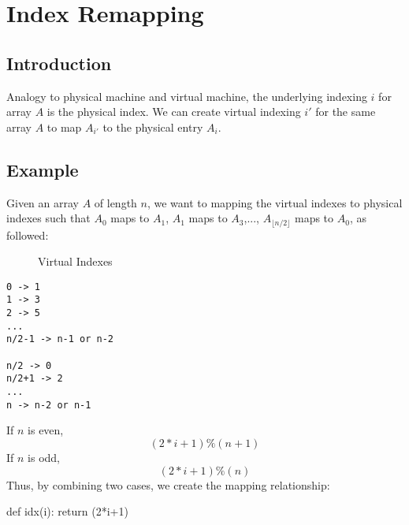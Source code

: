 \section{Index Remapping}
\subsection{Introduction}
 Analogy to physical machine and virtual machine, the underlying indexing $i$ for array $A$ is the physical index. We can create virtual indexing $i'$ for the same array $A$ to map $A_{i'}$ to the physical entry $A_{i}$.
\subsection{Example}
 Given an array $A$ of length $n$, we want to mapping the virtual indexes to physical indexes such that $A_0$ maps to $A_1$, $A_1$ maps to $A_3$,..., $A_{\lfloor n/2\rfloor}$ maps to $A_0$, as followed: 
\begin{figure}[hbtp]
\centering
{}
\caption{Virtual Indexes}
\label{fig:virtual_indexes}
\end{figure}
\begin{lstlisting}
0 -> 1
1 -> 3
2 -> 5
...
n/2-1 -> n-1 or n-2

n/2 -> 0
n/2+1 -> 2
...
n -> n-2 or n-1
\end{lstlisting}
If $n$ is even, 
$$
(2*i+1)\%(n+1)
$$
If $n$ is odd,
$$
(2*i+1)\%(n)
$$
Thus, by combining two cases, we create the mapping relationship: 
\begin{python}
def idx(i):
    return (2*i+1) %
\end{python}

